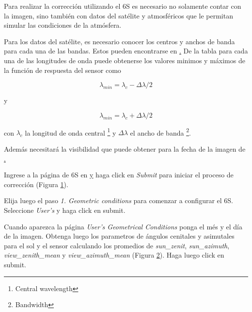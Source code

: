 Para realizar la corrección utilizando el 6S es necesario no solamente contar con la imagen, sino también con datos del satélite y atmosféricos que le permitan simular las condiciones de la atmósfera.

Para los datos del satélite, es necesario conocer los centros y anchos de banda para cada una de las bandas. Estos pueden encontrarse en \href{https://goo.gl/epQ6cw}. De la tabla para cada una de las longitudes de onda puede obtenerse los valores minimos y máximos de la función de respuesta del sensor como

\begin{equation}
    \lambda_{min} = \lambda_{c} - \Delta \lambda /2
\end{equation}

y

\begin{equation}
    \lambda_{min} = \lambda_{c} + \Delta \lambda /2
\end{equation}

con $\lambda_c$ la longitud de onda central \footnote{Central wavelength} y $\Delta \lambda$ el ancho de banda \footnote{Bandwidth}.

Además necesitará la visibilidad que puede obtener para la fecha de la imagen de \href{https://goo.gl/6ozXfH}.

Ingrese a la página de 6S en \href{http://6s.ltdri.org/pages/run6SV.html} y haga click en \emph{Submit} para iniciar el proceso de corrección (Figura \ref{fig:s61}).

\begin{figure}[h!]
    \centering
    \caption{}
    \label{fig:s61}
\end{figure}

Elija luego el paso \emph{1. Geometric conditions} para comenzar a configurar el 6S. Seleccione \emph{User's} y haga click en submit.

Cuando aparezca la página \emph{User's Geometrical Conditions} ponga el més y el día de la imagen. Obtenga luego los parametros de ángulos cenitales y asimutales para el sol y el sensor calculando los promedios de \emph{sun\_zenit}, \emph{sun\_azimuth}, \emph{view\_zenith\_mean} y \emph{view\_azimuth\_mean} (Figura \ref{fig:6sgeo}).  Haga luego click en submit.

\begin{figure}[h!]
    \centering
    \caption{}
    \label{fig:6sgeo}
\end{figure}

